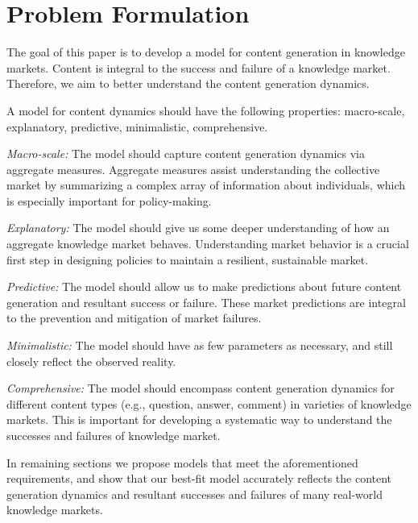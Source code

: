 \section{Problem Formulation} 
The goal of this paper is to develop a model for content generation in knowledge markets. Content is integral to the success and failure of a knowledge market. Therefore, we aim to better understand the content generation dynamics.

A model for content dynamics should have the following properties: macro-scale, explanatory, predictive, minimalistic, comprehensive.



\emph{Macro-scale:} The model should capture content generation dynamics via aggregate measures. Aggregate measures assist understanding the collective market by summarizing a complex array of information about individuals, which is especially important for policy-making.

\emph{Explanatory:} The model should give us some deeper understanding of how an aggregate knowledge market behaves. Understanding market behavior is a crucial first step in designing policies to maintain a resilient, sustainable market.

\emph{Predictive:} The model should allow us to make predictions about future content generation and resultant success or failure. These market predictions are integral to the prevention and mitigation of market failures.

\emph{Minimalistic:} The model should have as few parameters as necessary, and still closely reflect the observed reality. %

\emph{Comprehensive:} The model should encompass content generation dynamics for different content types (e.g., question, answer, comment) in varieties of knowledge markets. This is important for developing a systematic way to understand the successes and failures of knowledge market.

In remaining sections we propose models that meet the aforementioned requirements, and show that our best-fit model accurately reflects the content generation dynamics and resultant successes and failures of many real-world knowledge markets.

